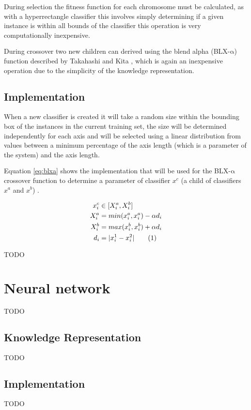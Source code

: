 \documentclass[a4paper]{article}
\newcommand\numberthis{\addtocounter{equation}{1}\tag{\theequation}}
\begin{document}
During selection the fitness function for each chromosome must be calculated, as
with a hyperrectangle classifier this involves simply determining if a given
instance is within all bounds of the classifier this operation is very
computationally inexpensive.

During crossover two new children can derived using the blend alpha
(BLX-$\mathrm{\alpha}$) function described by Takahashi and Kita \cite{blxa},
which is again an inexpensive operation due to the simplicity of the knowledge
representation.

\subsection{Implementation}

When a new classifier is created it will take a random size within the bounding
box of the instances in the current training set, the size will be determined
independently for each axis and will be selected using a linear distribution
from values between a minimum percentage of the axis length (which is a
parameter of the system) and the axis length.

Equation \ref{eq:blxa} shows the implementation that will be used for the
BLX-$\mathrm{\alpha}$ crossover function to determine a parameter of classifier
$x^{c}$ (a child of classifiers $x^{a}$ and $x^{b}$) \cite{blxa}.

\begin{align*}
  x^{c}_{i} &\in [X^{a}_{i}, X^{b}_{i}] \\
  X^{a}_{i} &= min(x^{a}_{i}, x^{a}_{i}) - \alpha d_{i} \\
  X^{b}_{i} &= max(x^{b}_{i}, x^{b}_{i}) + \alpha d_{i} \\
  d_{i} &= |x^{1}_{i} - x^{2}_{i}|
  \numberthis
  \label{eq:blxa}
\end{align*}

TODO

\section{Neural network}

TODO

\subsection{Knowledge Representation}

TODO

\subsection{Implementation}

TODO

\printbibliography
\end{document}
